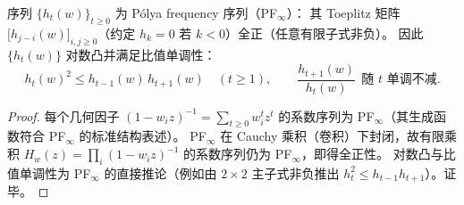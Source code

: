 \begin{theorem}\label{thm:pom-complete-homogeneous-pf-infty}
序列 \(\{h_t(w)\}_{t\ge0}\) 为 Pólya frequency 序列（PF\(_\infty\)）：
其 Toeplitz 矩阵 \(\bigl[h_{j-i}(w)\bigr]_{i,j\ge0}\)（约定 \(h_k=0\) 若 \(k<0\)）全正（任意有限子式非负）。
因此 \(\{h_t(w)\}\) 对数凸并满足比值单调性：
\[
h_t(w)^2\le h_{t-1}(w)\,h_{t+1}(w)\quad(t\ge1),
\qquad
\frac{h_{t+1}(w)}{h_t(w)}\ \ \text{随 \(t\) 单调不减}.
\]
\end{theorem}
\begin{proof}
每个几何因子 \((1-w_i z)^{-1}=\sum_{t\ge0} w_i^t z^t\) 的系数序列为 PF\(_\infty\)（其生成函数符合 PF\(_\infty\) 的标准结构表述）。
PF\(_\infty\) 在 Cauchy 乘积（卷积）下封闭，故有限乘积 \(H_w(z)=\prod_i(1-w_i z)^{-1}\) 的系数序列仍为 PF\(_\infty\)，即得全正性。
对数凸与比值单调性为 PF\(_\infty\) 的直接推论（例如由 \(2\times2\) 主子式非负推出 \(h_t^2\le h_{t-1}h_{t+1}\)）。证毕。
\end{proof}

